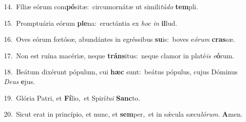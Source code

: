 {\numbfont\textcolor{\numbcolor}{14.}}~Fíliæ eórum com\-\textbf{pó}\-sitæ:~\star circumornátæ ut simili\-\textit{tú}\-\textit{do} \textbf{tem}\-pli.\par
{\numbfont\textcolor{\numbcolor}{15.}}~Promptuária eórum \textbf{ple}\-na:~\star eructántia ex \textit{hoc} \textit{in} \textbf{il}\-lud.\par
{\numbfont\textcolor{\numbcolor}{16.}}~Oves eórum fœtósæ, abundántes in egréssibus \textbf{su}\-is:~\star boves e\-\textit{ó}\-\textit{rum} \textbf{cras}\-sæ.\par
{\numbfont\textcolor{\numbcolor}{17.}}~Non est ruína macériæ, neque \textbf{tráns}\-itus:~\star neque clamor in platé\textit{is} \textit{e}\-\textbf{ó}rum.\par
{\numbfont\textcolor{\numbcolor}{18.}}~Beátum dixérunt pópulum, cui \textbf{hæc} sunt:~\star beátus pópulus, cujus Dóminus \textit{De}\-\textit{us} \textbf{e}\-jus.\par
{\numbfont\textcolor{\numbcolor}{19.}}~Glória Patri, et \textbf{Fí}\-lio,~\star et Spirí\-\textit{tu}\-\textit{i} \textbf{Sanc}\-to.\par
{\numbfont\textcolor{\numbcolor}{20.}}~Sicut erat in princípio, et nunc, et \textbf{sem}\-per,~\star et in sǽcula sæcu\-\textit{ló}\-\textit{rum}. \textbf{A}\-men.\par
